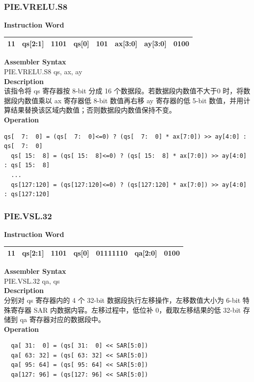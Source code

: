 \newpage
\subsubsection{PIE.VRELU.S8}\label{instruction:PIEVRELUS8}
\setlength\tabcolsep{6pt}
\textbf{Instruction Word} \\
\begin{tabular}{|c|c|c|c|c|c|c|c|}
	\hline
	11 & qs[2:1] & 1101 & qs[0] & 101 & ax[3:0] & ay[3:0] & 0100 \\
	\hline
\end{tabular}

\textbf{Assembler Syntax} \\
PIE.VRELU.S8 qs, ax, ay \\
\textbf{Description} \\
该指令将 qs 寄存器按 8-bit 分成 16 个数据段。若数据段内数值不大于0 时，将数据段内数值乘以 ax 寄存器低 8-bit 数值再右移 ay 寄存器的低 5-bit 数值，并用计算结果替换该区域内数值；否则数据段内数值保持不变。\\
\textbf{Operation}
\begin{lstlisting}[escapeinside=`?]
  qs[  7:  0] = (qs[  7:  0]<=0) ? (qs[  7:  0] * ax[7:0]) >> ay[4:0] : qs[  7:  0]
  qs[ 15:  8] = (qs[ 15:  8]<=0) ? (qs[ 15:  8] * ax[7:0]) >> ay[4:0] : qs[ 15:  8]
  ...
  qs[127:120] = (qs[127:120]<=0) ? (qs[127:120] * ax[7:0]) >> ay[4:0] : qs[127:120]
\end{lstlisting}

\newpage
\subsubsection{PIE.VSL.32}\label{instruction:PIEVSL32}
\setlength\tabcolsep{6pt}
\textbf{Instruction Word} \\
\begin{tabular}{|c|c|c|c|c|c|c|}
	\hline
	11 & qs[2:1] & 1101 & qs[0] & 01111110 & qa[2:0] & 0100 \\
	\hline
\end{tabular}

\textbf{Assembler Syntax} \\
PIE.VSL.32 qa, qs \\
\textbf{Description} \\
分别对 qs 寄存器内的 4 个 32-bit 数据段执行左移操作，左移数值大小为 6-bit 特殊寄存器 SAR 内数据内容。左移过程中，低位补 0，截取左移结果的低 32-bit 存储到 qa 寄存器对应的数据段中。\\
\textbf{Operation}
\begin{lstlisting}
  qa[ 31:  0] = (qs[ 31:  0] << SAR[5:0])
  qa[ 63: 32] = (qs[ 63: 32] << SAR[5:0])
  qa[ 95: 64] = (qs[ 95: 64] << SAR[5:0])
  qa[127: 96] = (qs[127: 96] << SAR[5:0])
\end{lstlisting}




